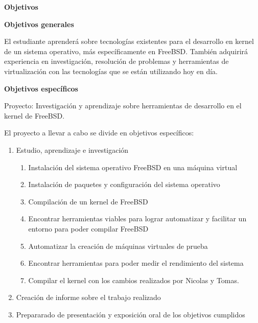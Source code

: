 \documentclass[a4paper, 15pt]{article}
\begin{document}
\begin{flushleft}
\Huge
\textbf{Objetivos}
\vspace{0.7cm}

\huge
\textbf{Objetivos generales}
\vspace{0.4cm}

\large
El estudiante aprenderá sobre tecnologías existentes para el desarrollo en kernel de un sistema operativo, más específicamente en FreeBSD. También adquirirá experiencia en investigación, resolución de problemas y herramientas de virtualización con las tecnologías que se están utilizando hoy en día.

\vspace{0.7cm}
\huge
\textbf{Objetivos específicos}
\vspace{0.4cm}

\large
Proyecto: Investigación y aprendizaje sobre herramientas de desarrollo en el kernel de FreeBSD.

\vspace{0.5cm}
El proyecto a llevar a cabo se divide en objetivos específicos:
\begin{enumerate}
	\item Estudio, aprendizaje e investigación
	\begin{enumerate}
		\item Instalación del sistema operativo FreeBSD en una máquina virtual
		\item Instalación de paquetes y configuración del sistema operativo
		\item Compilación de un kernel de FreeBSD
		\item Encontrar herramientas viables para lograr automatizar y facilitar un entorno para poder compilar FreeBSD
		\item Automatizar la creación de máquinas virtuales de prueba
		\item Encontrar herramientas para poder medir el rendimiento del sistema
		\item Compilar el kernel con los cambios realizados por Nicolas y Tomas.
	\end{enumerate}
	\item Creación de informe sobre el trabajo realizado
	\item Prepararado de presentación y exposición oral de los objetivos cumplidos
\end{enumerate}	
\end{flushleft}
\newpage
\end{document}
